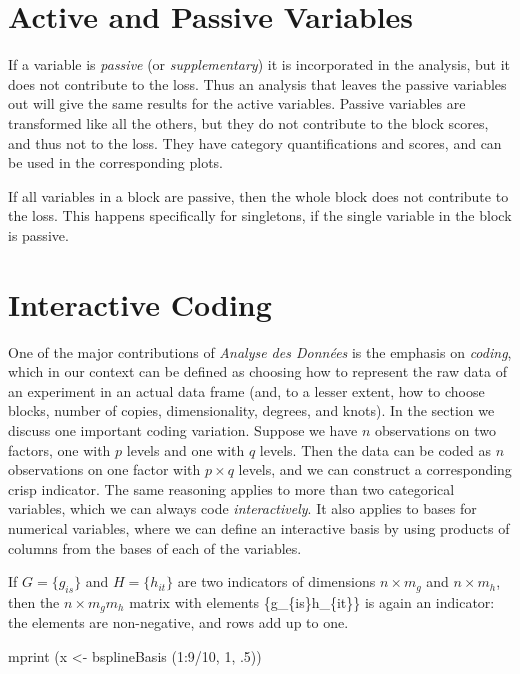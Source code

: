 \documentclass[
  12pt,
  letterpaper,
  DIV=11,
  numbers=noendperiod]{scrreprt}
\newenvironment{Shaded}{\begin{snugshade}}{\end{snugshade}}
\newcommand{\DecValTok}[1]{\textcolor[rgb]{0.68,0.00,0.00}{#1}}
\newcommand{\FunctionTok}[1]{\textcolor[rgb]{0.28,0.35,0.67}{#1}}
\newcommand{\NormalTok}[1]{\textcolor[rgb]{0.00,0.23,0.31}{#1}}
\newcommand{\OtherTok}[1]{\textcolor[rgb]{0.00,0.23,0.31}{#1}}
\newcommand{\SpecialCharTok}[1]{\textcolor[rgb]{0.37,0.37,0.37}{#1}}
\begin{document}
\section{Active and Passive
Variables}\label{active-and-passive-variables}

If a variable is \emph{passive} (or \emph{supplementary}) it is
incorporated in the analysis, but it does not contribute to the loss.
Thus an analysis that leaves the passive variables out will give the
same results for the active variables. Passive variables are transformed
like all the others, but they do not contribute to the block scores, and
thus not to the loss. They have category quantifications and scores, and
can be used in the corresponding plots.

If all variables in a block are passive, then the whole block does not
contribute to the loss. This happens specifically for singletons, if the
single variable in the block is passive.

\section{Interactive Coding}\label{interactive-coding}

One of the major contributions of \emph{Analyse des Données} is the
emphasis on \emph{coding}, which in our context can be defined as
choosing how to represent the raw data of an experiment in an actual
data frame (and, to a lesser extent, how to choose blocks, number of
copies, dimensionality, degrees, and knots). In the section we discuss
one important coding variation. Suppose we have \(n\) observations on
two factors, one with \(p\) levels and one with \(q\) levels. Then the
data can be coded as \(n\) observations on one factor with \(p\times q\)
levels, and we can construct a corresponding crisp indicator. The same
reasoning applies to more than two categorical variables, which we can
always code \emph{interactively}. It also applies to bases for numerical
variables, where we can define an interactive basis by using products of
columns from the bases of each of the variables.

If \(G=\{g_{is}\}\) and \(H=\{h_{it}\}\) are two indicators of
dimensions \(n\times m_g\) and \(n\times m_h\), then the
\(n\times m_gm_h\) matrix with elements \{g\_\{is\}h\_\{it\}\} is again
an indicator: the elements are non-negative, and rows add up to one.

\begin{Shaded}
\begin{Highlighting}[]
\FunctionTok{mprint}\NormalTok{ (x }\OtherTok{\textless{}{-}} \FunctionTok{bsplineBasis}\NormalTok{ (}\DecValTok{1}\SpecialCharTok{:}\DecValTok{9}\SpecialCharTok{/}\DecValTok{10}\NormalTok{, }\DecValTok{1}\NormalTok{, .}\DecValTok{5}\NormalTok{))}
\end{Highlighting}
\end{Shaded}
\end{document}
